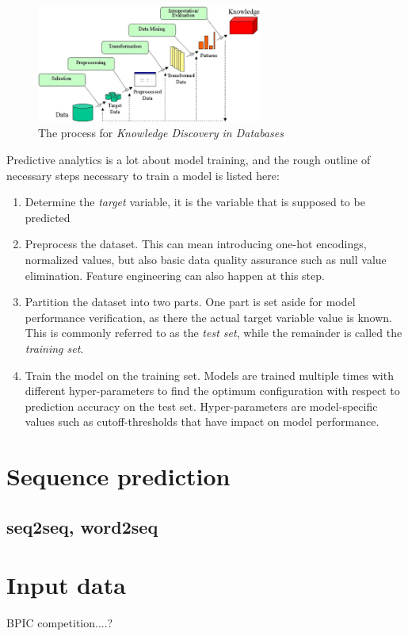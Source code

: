 \begin{figure}
	\centering
	\includegraphics[width=20em]{gfx/kdd_process}
	\caption{The process for \textit{Knowledge Discovery in Databases}}
	\label{fig:kdd_process}
\end{figure}
Predictive analytics is a lot about model training, and the rough outline of necessary steps necessary to train a model is listed here:
\begin{enumerate}
	\item Determine the \textit{target} variable, it is the variable that is supposed to be predicted
	\item Preprocess the dataset. This can mean introducing one-hot encodings, normalized values, but also basic data quality assurance such as null value elimination. Feature engineering can also happen at this step.
	\item Partition the dataset into two parts. One part is set aside for model performance verification, as there the actual target variable value is known. This is commonly referred to as the \textit{test set}, while the remainder is called the \textit{training set}.
	\item Train the model on the training set. Models are trained multiple times with different hyper-parameters to find the optimum configuration with respect to prediction accuracy on the test set. Hyper-parameters are model-specific values such as cutoff-thresholds that have impact on model performance.
\end{enumerate}

\section{Sequence prediction}
\subsection{seq2seq, word2seq}

\section{Input data}
BPIC competition....?

